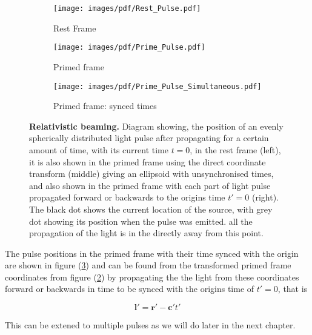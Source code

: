 \begin{figure}[H]
	\begin{subfigure}{.32\textwidth}
		\centering
		\texttt{[image: images/pdf/Rest\_Pulse.pdf]}
		\caption{Rest Frame \newline}
		\label{fig: Relativistic beaming 1}
	\end{subfigure}
	\begin{subfigure}{.32\textwidth}
		\centering
		\texttt{[image: images/pdf/Prime\_Pulse.pdf]}
		\caption{Primed frame \newline}
		\label{fig: Relativistic beaming 2}
	\end{subfigure}
	\begin{subfigure}{.32\textwidth}
		\centering
		\texttt{[image: images/pdf/Prime\_Pulse\_Simultaneous.pdf]}
		\caption{Primed frame: synced times}
		\label{fig: Relativistic beaming 3}
	\end{subfigure}
	\caption{\textbf{Relativistic beaming.} Diagram showing, the position of an evenly spherically distributed light pulse after propagating for a certain amount of time, with its current time ${t}=0$, in the rest frame (left), it is also shown in the primed frame using the direct coordinate transform (middle) giving an ellipsoid with unsynchronised times, and also shown in the primed frame with each part of light pulse propagated forward or backwards to the origins time $t{'}=0$ (right). The black dot shows the current location of the source, with grey dot showing its position when the pulse was emitted. all the propagation of the light is in the directly away from this point.}
	\label{fig Relativistic beaming}
\end{figure}

The pulse positions in the primed frame with their time synced with the origin are shown in figure (\ref{fig: Relativistic beaming 3}) and can be found from the transformed primed frame coordinates from figure (\ref{fig: Relativistic beaming 2}) by propagating the the light from these coordinates forward or backwards in time to be synced with the origins time of $t{'}=0$, that is

\begin{equation}
	\mathbf{l}{'} = \mathbf{r}{'} - \mathbf{c}{'} t{'}
\end{equation}

This can be extened to multiple pulses as we will do later in the next chapter.


